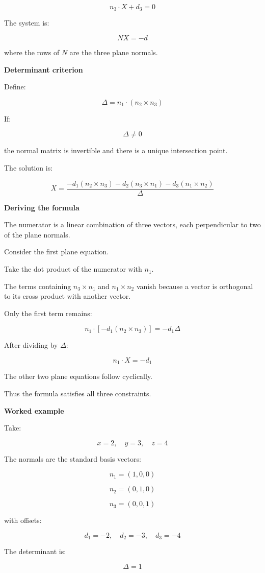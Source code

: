 \[
n_3\cdot X+d_3=0
\]

The system is:

\[
NX=-d
\]

where the rows of \(N\) are the three plane normals.

\textbf{Determinant criterion}

Define:

\[
\boxed{ \Delta=n_1\cdot(n_2\times n_3) }
\]

If:

\[
\Delta\ne0
\]

the normal matrix is invertible and there is a unique intersection point.

The solution is:

\[
\boxed{ X= \frac{ -d_1(n_2\times n_3) -d_2(n_3\times n_1) -d_3(n_1\times n_2) }{ \Delta } }
\]

\textbf{Deriving the formula}

The numerator is a linear combination of three vectors, each perpendicular to two of the plane normals.

Consider the first plane equation.

Take the dot product of the numerator with \(n_1\).

The terms containing \(n_3\times n_1\) and \(n_1\times n_2\) vanish because a vector is orthogonal to its cross product with another vector.

Only the first term remains:

\[
n_1\cdot[-d_1(n_2\times n_3)] =-d_1\Delta
\]

After dividing by \(\Delta\):

\[
n_1\cdot X=-d_1
\]

The other two plane equations follow cyclically.

Thus the formula satisfies all three constraints.

\textbf{Worked example}

Take:

\[
x=2,\quad y=3,\quad z=4
\]

The normals are the standard basis vectors:

\[
n_1=(1,0,0)
\]

\[
n_2=(0,1,0)
\]

\[
n_3=(0,0,1)
\]

with offsets:

\[
d_1=-2,\quad d_2=-3,\quad d_3=-4
\]

The determinant is:

\[
\Delta=1
\]

